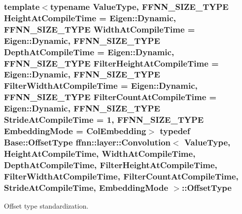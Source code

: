 \hypertarget{classffnn_1_1layer_1_1_convolution_af3cbd4933c8bad5f58fc00d3ac1d33a5}{
\subsubsection[{Offset\-Type}]{\setlength{\rightskip}{0pt plus 5cm}template$<$typename Value\-Type, F\-F\-N\-N\-\_\-\-S\-I\-Z\-E\-\_\-\-T\-Y\-P\-E Height\-At\-Compile\-Time = Eigen\-::\-Dynamic, F\-F\-N\-N\-\_\-\-S\-I\-Z\-E\-\_\-\-T\-Y\-P\-E Width\-At\-Compile\-Time = Eigen\-::\-Dynamic, F\-F\-N\-N\-\_\-\-S\-I\-Z\-E\-\_\-\-T\-Y\-P\-E Depth\-At\-Compile\-Time = Eigen\-::\-Dynamic, F\-F\-N\-N\-\_\-\-S\-I\-Z\-E\-\_\-\-T\-Y\-P\-E Filter\-Height\-At\-Compile\-Time = Eigen\-::\-Dynamic, F\-F\-N\-N\-\_\-\-S\-I\-Z\-E\-\_\-\-T\-Y\-P\-E Filter\-Width\-At\-Compile\-Time = Eigen\-::\-Dynamic, F\-F\-N\-N\-\_\-\-S\-I\-Z\-E\-\_\-\-T\-Y\-P\-E Filter\-Count\-At\-Compile\-Time = Eigen\-::\-Dynamic, F\-F\-N\-N\-\_\-\-S\-I\-Z\-E\-\_\-\-T\-Y\-P\-E Stride\-At\-Compile\-Time = 1, F\-F\-N\-N\-\_\-\-S\-I\-Z\-E\-\_\-\-T\-Y\-P\-E Embedding\-Mode = Col\-Embedding$>$ typedef {\bf Base\-::\-Offset\-Type} {\bf ffnn\-::layer\-::\-Convolution}$<$ Value\-Type, Height\-At\-Compile\-Time, Width\-At\-Compile\-Time, Depth\-At\-Compile\-Time, Filter\-Height\-At\-Compile\-Time, Filter\-Width\-At\-Compile\-Time, Filter\-Count\-At\-Compile\-Time, Stride\-At\-Compile\-Time, {\bf Embedding\-Mode} $>$\-::{\bf Offset\-Type}}}\label{classffnn_1_1layer_1_1_convolution_af3cbd4933c8bad5f58fc00d3ac1d33a5}


Offset type standardization. 

